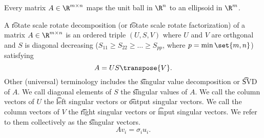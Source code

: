 

Every matrix $A \in \R^{m \times n}$ maps the unit ball in $\R^n$ to an ellipsoid in $\R^{m}$.


A \t{rotate scale rotate decomposition} (or \t{rotate scale rotate factorization}) of a matrix $A \in \R^{m \times n}$ is an ordered triple $(U, S, V)$ where $U$ and $V$ are orthgonal and $S$ is diagonal decreasing ($S_{11} \geq S_{22} \geq \dots \geq S_{pp}$, where $p = \min\set{m, n}$) satisfying
\[
  A = US\transpose{V}.
\]
Other (universal) terminology includes the \t{singular value decomposition} or \t{SVD} of $A$.
We call diagonal elements of $S$ the \t{singular values} of $A$.
We call the column vectors of $U$ the \t{left singular vectors} or \t{output singular vectors}.
We call the column vectors of $V$ the \t{right singular vectors} or \t{input singular vectors}.
We refer to them collectively as the \t{singular vectors}.
\[
  Av_i = \sigma_i u_i.
\]

\blankpage
